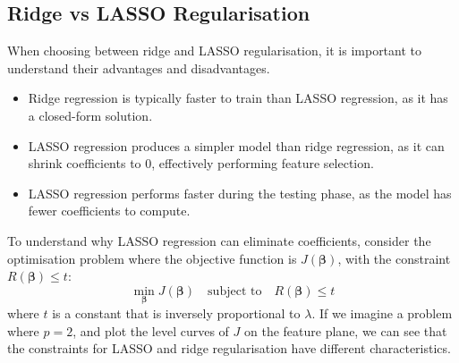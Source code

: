 \documentclass{article}
\begin{document}
\subsection{Ridge vs LASSO Regularisation}
When choosing between ridge and LASSO regularisation, it is important
to understand their advantages and disadvantages.
\begin{itemize}
    \item Ridge regression is typically faster to train than LASSO
          regression, as it has a closed-form solution.
    \item LASSO regression produces a simpler model than ridge
          regression, as it can shrink coefficients to 0, effectively
          performing feature selection.
    \item LASSO regression performs faster during the testing phase, as
          the model has fewer coefficients to compute.
\end{itemize}
To understand why LASSO regression can eliminate coefficients, consider
the optimisation problem where the objective function is
\(J\left( \symbf{\beta} \right)\), with the constraint
\(R\left( \symbf{\beta} \right) \leqslant t\):
\begin{equation*}
    \min_{\symbf{\beta}} J\left( \symbf{\beta} \right) \quad \text{subject to} \quad R\left( \symbf{\beta} \right) \leqslant t
\end{equation*}
where \(t\) is a constant that is inversely proportional to \(\lambda\).
If we imagine a problem where \(p = 2\), and plot the level curves of
\(J\) on the feature plane, we can see that the constraints for
LASSO and ridge regularisation have different characteristics.
\end{document}
